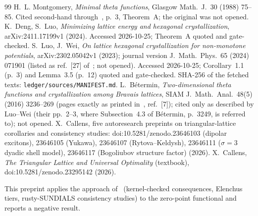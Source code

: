 \documentclass[10pt]{article}
\begin{document}
\begin{thebibliography}{99}\small
{} H.~L. Montgomery, \emph{Minimal theta functions}, Glasgow Math.\ J.\ 30 (1988) 75--85. Cited second-hand through~\cite{dengluo}, p.~3, Theorem~A; the original was not opened.
 K.~Deng, S.~Luo, \emph{Minimizing lattice energy and hexagonal crystallization}, arXiv:2411.17199v1 (2024). Accessed 2026-10-25; Theorem~A quoted and gate-checked.
 S.~Luo, J.~Wei, \emph{On lattice hexagonal crystallization for non-monotone potentials}, arXiv:2302.05042v1 (2023); journal version J.\ Math.\ Phys.\ 65 (2024) 071901 (listed as ref.~[27] of~\cite{dengluo}; not opened). Accessed 2026-10-25; Corollary~1.1 (p.~3) and Lemma~3.5 (p.~12) quoted and gate-checked. SHA-256 of the fetched texts: \texttt{ledger/sources/MANIFEST.md}.
 L.~B\'etermin, \emph{Two-dimensional theta functions and crystallization among Bravais lattices}, SIAM J.\ Math.\ Anal.\ 48(5) (2016) 3236--269 (pages exactly as printed in~\cite{luowei}, ref.~[7]); cited only as described by Luo--Wei (their pp.~2--3, where Subsection~4.3 of B\'etermin, p.~3249, is referred to); not opened.
 X.~Callens, five autoresearch preprints on triangular-lattice corollaries and consistency studies: doi:10.5281/zenodo.23646103 (dipolar excitons), 23646105 (Yukawa), 23646107 (Rytova--Keldysh),
23646111 ($\sigma=3$ dyadic shell model), 23646117 (Bogoliubov structure factor) (2026).
 X.~Callens, \emph{The Triangular Lattice and Universal Optimality} (textbook), doi:10.5281/zenodo.23295142 (2026).
\end{thebibliography}
\noindent This preprint applies the approach of~\cite{ar,txt} (kernel-checked consequences, Elenchus tiers, rusty-SUNDIALS consistency studies) to the zero-point functional and reports a negative result.
\end{document}
